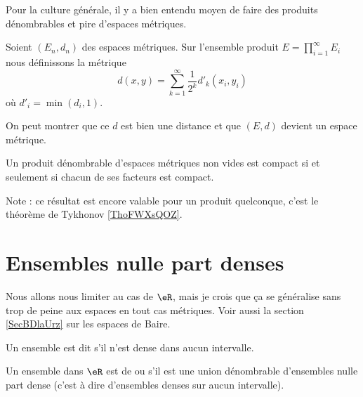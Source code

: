 Pour la culture générale, il y a bien entendu moyen de faire des produits dénombrables et pire d'espaces métriques.
\begin{definition}
    Soient \( (E_n,d_n)\) des espaces métriques. Sur l'ensemble produit \( E=\prod_{i=1}^{\infty}E_i\) nous définissons la métrique
    \begin{equation}
        d(x,y)=\sum_{k=1}^{\infty}\frac{1}{ 2^k }d'_k(x_i,y_i)
    \end{equation}
    où \( d'_i=\min(d_i,1)\).
\end{definition}
On peut montrer que ce \( d\) est bien une distance et que \( (E,d)\) devient un espace métrique.

\begin{theorem} \label{ThoKKBooNaZgoO}  %
    Un produit dénombrable d'espaces métriques non vides est compact si et seulement si chacun de ses facteurs est compact.
\end{theorem}
Note : ce résultat est encore valable pour un produit quelconque, c'est le théorème de Tykhonov \ref{ThoFWXsQOZ}.

\section{Ensembles nulle part denses}

Nous allons nous limiter au cas de \( \eR\), mais je crois que ça se généralise sans trop de peine aux espaces en tout cas métriques. Voir aussi la section \ref{SecBDlaUrz} sur les espaces de Baire.

\begin{definition}
    Un ensemble est dit  s'il n'est dense dans aucun intervalle.

    Un ensemble dans \( \eR\) est de  ou  s'il est une union dénombrable d'ensembles nulle part dense (c'est à dire d'ensembles denses sur aucun intervalle).
\end{definition}


